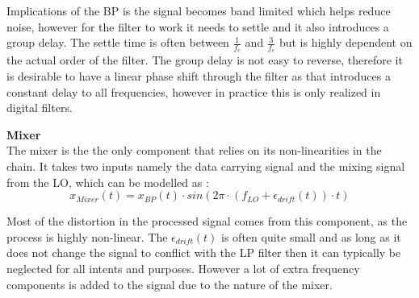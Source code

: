 Implications of the BP is the signal becomes band limited which helps reduce noise, however for the filter to work it needs to settle and it also introduces a group delay. The settle time is often between $\frac{1}{f_c}$ and $\frac{3}{f_c}$%
 but is highly dependent on the actual order of the filter. The group delay is not easy to reverse, therefore it is desirable to have a linear phase shift through the filter as that introduces a constant delay to all frequencies, however in practice this is only realized in digital filters. 


\textbf{Mixer}\\
The mixer is the the only component that relies on its non-linearities in the chain. It takes two inputs namely the data carrying signal and the mixing signal from the \gls{LO}, which can be modelled as \citep[p. 12]{Mixer}:
\begin{equation}
x_{Mixer}(t) = x_{BP}(t) \cdot sin\left(2\pi\cdot (f_{LO}+\epsilon_{drift}(t)) \cdot t\right)
\end{equation}
\begin{where}
\end{where}


Most of the distortion in the processed signal comes from this component, as the process is highly non-linear. The $\epsilon_{drift}(t)$ is often quite small and as long as it does not change the signal to conflict with the LP filter then it can typically be neglected for all intents and purposes. However a lot of extra frequency components is added to the signal due to the nature of the mixer.



